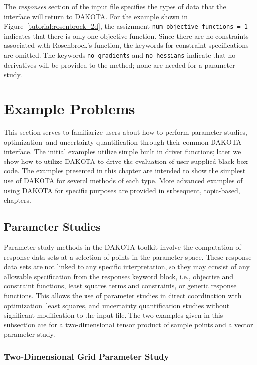 The \emph{responses} section of the input file specifies the types of
data that the interface will return to DAKOTA. For the example shown
in Figure~\ref{tutorial:rosenbrock_2d}, the assignment
\texttt{num\_objective\_functions = 1}
indicates that there is only one objective
function.  Since there are no constraints
associated with Rosenbrock's function, the keywords for
constraint specifications are omitted. The keywords
\texttt{no\_gradients} and \texttt{no\_hessians} indicate that no
derivatives will be provided to the method; none are needed for
a parameter study.

\section{Example Problems}\label{tutorial:example}

This section serves to familiarize users about how to perform parameter 
studies, optimization, and uncertainty quantification through their common
DAKOTA interface.  The initial examples utilize simple built in driver 
functions; later we show how to utilize DAKOTA to drive the evaluation of 
user supplied black box code.  The examples presented in this chapter 
are intended to show the simplest use of DAKOTA for several methods of 
each type.  More advanced examples of using DAKOTA for specific purposes 
are provided in subsequent, topic-based, chapters.

\subsection{Parameter Studies}\label{tutorial:example:param_study}

Parameter study methods in the DAKOTA toolkit involve the computation 
of response data sets at a selection of points in the parameter space. 
These response data sets are not linked to any specific interpretation,
so they may consist of any allowable specification from the responses 
keyword block, i.e., objective and constraint functions, least squares 
terms and constraints, or generic response functions. This allows the 
use of parameter studies in direct coordination with optimization, least 
squares, and uncertainty quantification studies without significant
modification to the input file.  
The two examples given in this subsection are for a two-dimensional 
tensor product of sample points and a vector parameter study.

\subsubsection{Two-Dimensional Grid Parameter Study}\label{tutorial:example:param_study:two}

